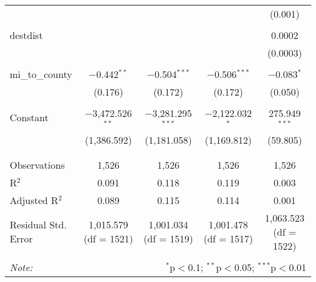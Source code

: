 \begin{table}[!htbp]
\begin{tabular}{@{\extracolsep{5pt}}lcccc}
  &  &  &  & (0.001) \\ 
  & & & & \\ 
 destdist &  &  &  & 0.0002 \\ 
  &  &  &  & (0.0003) \\ 
  & & & & \\ 
 mi\_to\_county & $-$0.442$^{**}$ & $-$0.504$^{***}$ & $-$0.506$^{***}$ & $-$0.083$^{*}$ \\ 
  & (0.176) & (0.172) & (0.172) & (0.050) \\ 
  & & & & \\ 
 Constant & $-$3,472.526$^{**}$ & $-$3,281.295$^{***}$ & $-$2,122.032$^{*}$ & 275.949$^{***}$ \\ 
  & (1,386.592) & (1,181.058) & (1,169.812) & (59.805) \\ 
  & & & & \\ 
\hline \\[-1.8ex] 
Observations & 1,526 & 1,526 & 1,526 & 1,526 \\ 
R$^{2}$ & 0.091 & 0.118 & 0.119 & 0.003 \\ 
Adjusted R$^{2}$ & 0.089 & 0.115 & 0.114 & 0.001 \\ 
Residual Std. Error & 1,015.579 (df = 1521) & 1,001.034 (df = 1519) & 1,001.478 (df = 1517) & 1,063.523 (df = 1522) \\ 
\hline 
\hline \\[-1.8ex] 
\textit{Note:}  & \multicolumn{4}{r}{$^{*}$p$<$0.1; $^{**}$p$<$0.05; $^{***}$p$<$0.01} \\ 
\end{tabular} 
\end{table} 
